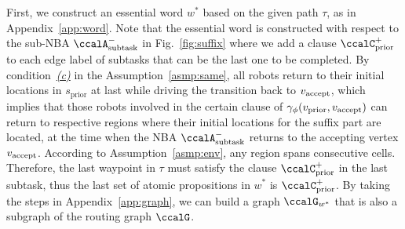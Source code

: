 \documentclass[Afour,sageh,times]{sagej}
\newcommand{\auto}[1]{\ccalA_{\textup{#1}}}
\newcommand{\vertex}[1]{v_{\textup{#1}}}
\begin{document}
{First, we construct an essential word $w^*$ based on the given path $\tau$, as in Appendix~\ref{app:word}.  Note that the essential word is constructed with respect to the sub-NBA $\auto{subtask}^-$ in Fig.~\ref{fig:suffix} where we add a  clause $\ccalC_{\text{prior}}^+$ to each edge label of subtasks that can be the last one to be completed. By condition~\hyperref[asmp:c]{\it (c)} in the Assumption~\ref{asmp:same}, all robots return to their initial locations in $s_{\text{prior}}$ at last while driving the transition back to $\vertex{accept}$, which implies that those robots involved in the certain clause of $\gamma_\phi(\vertex{prior}, \vertex{accept})$ can return to respective regions where their initial locations for the suffix part are located, at the  time when the NBA $\auto{subtask}^-$ returns to the accepting vertex $\vertex{accept}$. According to Assumption~\ref{asmp:env}, any region spans consecutive cells. Therefore, the last waypoint in $\tau$ must satisfy the clause $\ccalC_{\text{prior}}^+$ in the last subtask, thus the last set of atomic propositions in $w^*$ is $\ccalC_{\text{prior}}^+$. By taking the steps in Appendix~\ref{app:graph}, we can build a graph $\ccalG_{w^*}$ that is also a subgraph of the routing graph $\ccalG$.

}
\end{document}
